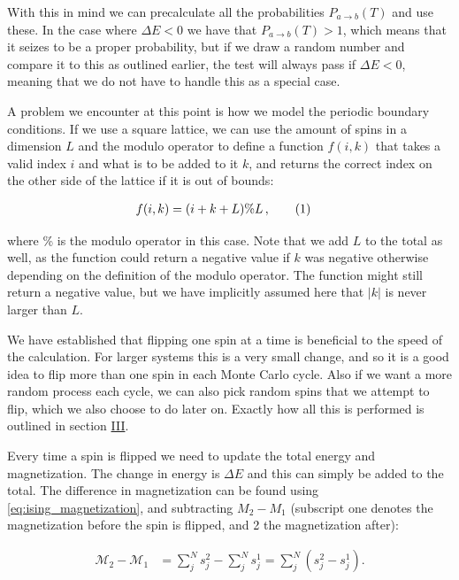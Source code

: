 \documentclass[reprint,english,notitlepage]{revtex4-1}  %
\newcommand\numberthis{\addtocounter{equation}{1}\tag{\theequation}}
\begin{document}
With this in mind we can precalculate all the probabilities $P_{a \to b} (T)$ and use these. In the case where $\Delta E < 0$ we have that $P_{a\to b} (T) > 1$, which means that it seizes to be a proper probability, but if we draw a random number and compare it to this as outlined earlier, the test will always pass if $\Delta E < 0$, meaning that we do not have to handle this as a special case.

A problem we encounter at this point is how we model the periodic boundary conditions. If we use a square lattice, we can use the amount of spins in a dimension $L$ and the modulo operator to define a function $f(i,k)$ that takes a valid index $i$ and what is to be added to it $k$, and returns the correct index on the other side of the lattice if it is out of bounds:

\begin{align*}
f(i,k) &= (i+k+L)\%L \, , \numberthis \label{eq:periodic}
\end{align*}

where \% is the modulo operator in this case. Note that we add $L$ to the total as well, as the function could return a negative value if $k$ was negative otherwise depending on the definition of the modulo operator. The function might still return a negative value, but we have implicitly assumed here that $|k|$ is never larger than $L$. 
 
We have established that flipping one spin at a time is beneficial to the speed of the calculation. For larger systems this is a very small change, and so it is a good idea to flip more than one spin in each Monte Carlo cycle. Also if we want a more random process each cycle, we can also pick random spins that we attempt to flip, which we also choose to do later on. Exactly how all this is performed is outlined in section \hyperref[sec:III]{III}.

Every time a spin is flipped we need to update the total energy and magnetization. The change in energy is $\Delta E$ and this can simply be added to the total. The difference in magnetization can be found using \eqref{eq:ising_magnetization}, and subtracting \(M_{2} - M_{1}\) (subscript one denotes the magnetization before the spin is flipped, and 2 the magnetization after): 

\begin{align*}
	\mathcal{M}_2 - \mathcal{M}_{1} &= \sum\limits_j^N s_j^{2} - \sum\limits_j^N s_j^{1} =
	\sum\limits_{j}^{N}\left(s_{j}^{2} - s_{j}^{1}\right).
\end{align*}
\end{document}
